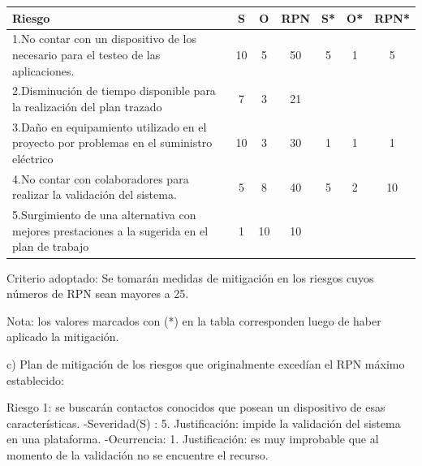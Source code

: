 \documentclass[
11pt, %
]{charter}
\begin{document}
\begin{table}[htpb]
\centering
\begin{tabularx}{\linewidth}{@{}|X|c|c|c|c|c|c|@{}}
\hline
\rowcolor[HTML]{C0C0C0} 
Riesgo & S & O & RPN & S* & O* & RPN* \\ \hline
1.No contar con un dispositivo de los necesario para el testeo de las aplicaciones.    &   10 & 5  &  50  &  5  & 1   & 5   \\ \hline
2.Disminución de tiempo disponible para la realización del plan trazado       & 7  & 3  & 21    &    &    &      \\ \hline
3.Daño en equipamiento utilizado en el proyecto por problemas en el suministro eléctrico       & 10  & 3  & 30    &  1  &   1 &     1 \\ \hline
4.No contar con colaboradores para realizar la validación del sistema.     & 5  & 8 & 40    &  5  &  2  &    10  \\ \hline
5.Surgimiento de una alternativa con mejores prestaciones a la sugerida en el plan de trabajo       & 1  & 10 & 10    &    &    &      \\ \hline
\end{tabularx}%
\end{table}

Criterio adoptado: 
Se tomarán medidas de mitigación en los riesgos cuyos números de RPN sean mayores a 25.

Nota: los valores marcados con (*) en la tabla corresponden luego de haber aplicado la mitigación.

c) Plan de mitigación de los riesgos que originalmente excedían el RPN máximo establecido:
 
          
Riesgo 1: se buscarán contactos conocidos que posean un dispositivo de esas características.\newline
-Severidad(S) : 5.\newline
	Justificación: impide la validación del sistema en una plataforma.\newline
-Ocurrencia: 1.\newline
	Justificación: es muy improbable que al momento de la validación no se encuentre el recurso.
\end{document}
